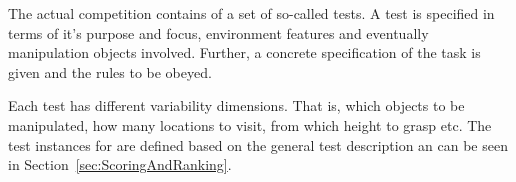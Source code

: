 
The actual competition contains of a set of so-called tests. 
A test is specified in terms of it's purpose and focus, environment features and eventually manipulation objects involved. Further, a concrete specification of the task is given and the rules to be obeyed. 

Each test has different variability dimensions. That is, which objects to be manipulated, how many locations to visit, from which height to grasp etc. The test instances for \YEAR are defined based on the general test description an can be seen in Section~\ref{sec:ScoringAndRanking}. 













%


